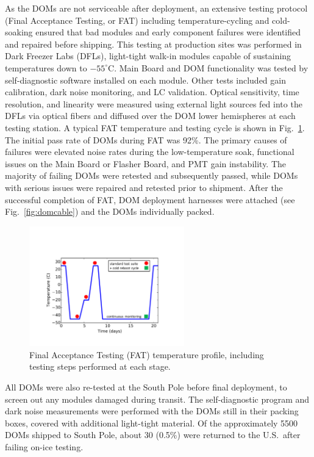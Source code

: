As the DOMs are not serviceable after deployment, an extensive testing
protocol (Final Acceptance Testing, or FAT) including temperature-cycling
and cold-soaking ensured that bad modules and early component failures were
identified and repaired before shipping.  This testing at production sites
was performed in Dark Freezer Labs (DFLs), light-tight walk-in 
modules capable of sustaining temperatures down to $-55^\circ$C.  Main Board
and DOM functionality was tested by self-diagnostic software installed on
each module.  Other tests included gain calibration, dark noise monitoring,
and LC validation.  Optical sensitivity, time resolution,
and linearity were measured using external light sources fed into the DFLs
via optical fibers and diffused over the DOM lower hemispheres at each
testing station.  A typical FAT temperature and testing cycle is shown in
Fig.~\ref{fig:fat_cycle}. The initial pass rate of DOMs during FAT was
92\%.  The primary causes of failures were elevated noise rates during the
low-temperature soak, functional issues on the Main Board or Flasher Board,
and PMT gain instability.  The majority of failing DOMs were retested and
subsequently passed, while DOMs with serious issues were repaired and
retested prior to shipment. After the successful completion of FAT, DOM
deployment harnesses were attached (see Fig.~\ref{fig:domcable}) and the DOMs individually packed. 

\begin{figure}[!h]
 \centering
 \includegraphics[width=0.6\textwidth]{graphics/dom/production/fat_cycle.pdf}
 \caption{Final Acceptance Testing (FAT) temperature profile, including
   testing steps performed at each stage.}
 \label{fig:fat_cycle}
\end{figure}

All DOMs were also re-tested at the South Pole before final deployment, to
screen out any modules damaged during transit.  The self-diagnostic
program and dark noise measurements were performed with the DOMs still in
their packing boxes, covered with additional light-tight material.  Of the
approximately 5500 DOMs shipped to South Pole, about 30 (0.5\%) were
returned to the U.S.~after failing on-ice testing.    

